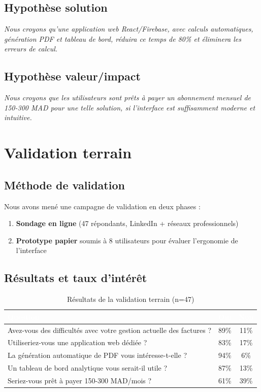 \documentclass[12pt,a4paper]{report}
\begin{document}
\subsection{Hypothèse solution}
\textit{Nous croyons qu'une application web React/Firebase, avec calculs automatiques, génération PDF et tableau de bord, réduira ce temps de 80\% et éliminera les erreurs de calcul.}

\subsection{Hypothèse valeur/impact}
\textit{Nous croyons que les utilisateurs sont prêts à payer un abonnement mensuel de 150-300 MAD pour une telle solution, si l'interface est suffisamment moderne et intuitive.}

\section{Validation terrain}

\subsection{Méthode de validation}

Nous avons mené une campagne de validation en deux phases :
\begin{enumerate}
    \item \textbf{Sondage en ligne} (47 répondants, LinkedIn + réseaux professionnels)
    \item \textbf{Prototype papier} soumis à 8 utilisateurs pour évaluer l'ergonomie de l'interface
\end{enumerate}

\subsection{Résultats et taux d'intérêt}

\begin{table}[H]
\centering
\caption{Résultats de la validation terrain (n=47)}
\label{tab:validation}
\begin{tabularx}{\textwidth}{|X|c|c|}
\hline
\rowcolor{emsiblue}\textcolor{white}{\textbf{Question}} & \textcolor{white}{\textbf{Oui}} & \textcolor{white}{\textbf{Non}} \\
\hline
Avez-vous des difficultés avec votre gestion actuelle des factures ? & 89\% & 11\% \\
Utiliseriez-vous une application web dédiée ? & 83\% & 17\% \\
La génération automatique de PDF vous intéresse-t-elle ? & 94\% & 6\% \\
Un tableau de bord analytique vous serait-il utile ? & 87\% & 13\% \\
Seriez-vous prêt à payer 150-300 MAD/mois ? & 61\% & 39\% \\
\hline
\end{tabularx}
\end{table}
\end{document}
